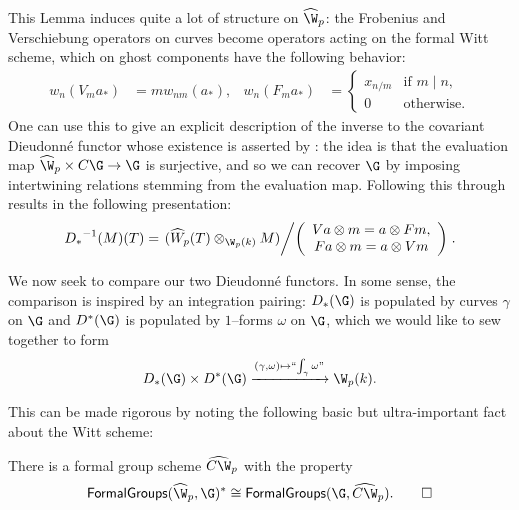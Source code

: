 This Lemma induces quite a lot of structure on $\widehat{\W}_p$: the Frobenius and Verschiebung operators on curves become operators acting on the formal Witt scheme, which on ghost components have the following behavior:
\begin{align*}
w_n(V_m a_*) & = m w_{nm}(a_*), &
w_n(F_m a_*) & = \begin{cases} x_{n/m} & \text{if $m \mid n$}, \\ 0 & \text{otherwise}. \end{cases}
\end{align*}
One can use this to give an explicit description of the inverse to the covariant Dieudonn\'e functor whose existence is asserted by : the idea is that the evaluation map $\widehat{\W}_p \times C\G \to \G$ is surjective, and so we can recover $\G$ by imposing intertwining relations stemming from the evaluation map.  Following this through results in the following presentation: \[{D_*}^{-1}(M)(T) = \left. (\widehat{W}_p(T) \otimes_{\W_p(k)} M) \middle/ \left( \begin{array}{c} Va \otimes m = a \otimes Fm, \\ Fa \otimes m = a \otimes Vm \end{array} \right) \right. .\]

We now seek to compare our two Dieudonn\'e functors.  In some sense, the comparison is inspired by an integration pairing: $D_*(\G)$ is populated by curves $\gamma$ on $\G$ and $D^*(\G)$ is populated by $1$--forms $\omega$ on $\G$, which we would like to sew together to form \[D_*(\G) \times D^*(\G) \xrightarrow{(\gamma, \omega) \mapsto \text{``$\int_\gamma \omega$''}} \W_p(k).\]

This can be made rigorous by noting the following basic but ultra-important fact about the Witt scheme:
\begin{lemma}
There is a formal group scheme $\widehat{C\W}_p$ with the property \[\CatOf{FormalGroups}(\widehat{\W}_p, \G)^* \cong \CatOf{FormalGroups}(\G, \widehat{C\W}_p). \qed\]
\end{lemma}

